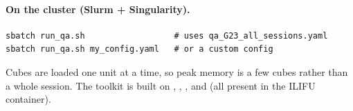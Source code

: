 \documentclass[11pt,a4paper]{article}
\begin{document}
\paragraph{On the cluster (Slurm + Singularity).}
\begin{lstlisting}
sbatch run_qa.sh                  # uses qa_G23_all_sessions.yaml
sbatch run_qa.sh my_config.yaml   # or a custom config
\end{lstlisting}
Cubes are loaded one unit at a time, so peak memory is a few cubes rather than a
whole session. The toolkit is built on  \citep{harris2020},
 \citep{virtanen2020},  \citep{astropy2022},
 \citep{hunter2007} and  \citep{plotly} (all
present in the ILIFU  container).

\appendix
\end{document}
